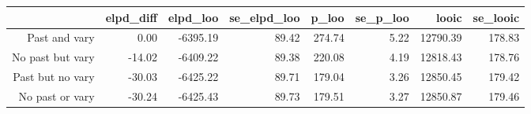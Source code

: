 \begin{table}[ht]
\centering
\begin{tabular}{rrrrrrrr}
  \hline
 & elpd\_diff & elpd\_loo & se\_elpd\_loo & p\_loo & se\_p\_loo & looic & se\_looic \\ 
  \hline
Past and vary & 0.00 & -6395.19 & 89.42 & 274.74 & 5.22 & 12790.39 & 178.83 \\ 
  No past but vary & -14.02 & -6409.22 & 89.38 & 220.08 & 4.19 & 12818.43 & 178.76 \\ 
  Past but no vary & -30.03 & -6425.22 & 89.71 & 179.04 & 3.26 & 12850.45 & 179.42 \\ 
  No past or vary & -30.24 & -6425.43 & 89.73 & 179.51 & 3.27 & 12850.87 & 179.46 \\ 
   \hline
\end{tabular}
\end{table}
